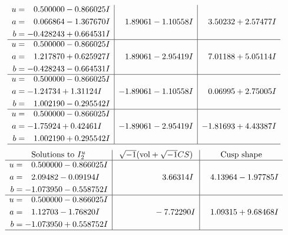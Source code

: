\documentclass[1p]{elsarticle_modified}
\theoremstyle{definition}
\newcommand{\I}{\sqrt{-1}}
\begin{document}
$$\begin{array}{c|c|c}
\begin{aligned}
u &= \phantom{-}0.500000 - 0.866025 I \\
a &= \phantom{-}0.066864 - 1.367670 I \\
b &= -0.428243 + 0.664531 I\end{aligned}
 & \phantom{-}1.89061 - 1.10558 I & \phantom{-}3.50232 + 2.57477 I \\ \hline\begin{aligned}
u &= \phantom{-}0.500000 - 0.866025 I \\
a &= \phantom{-}1.217870 + 0.625927 I \\
b &= -0.428243 - 0.664531 I\end{aligned}
 & \phantom{-}1.89061 - 2.95419 I & \phantom{-}7.01188 + 5.05114 I \\ \hline\begin{aligned}
u &= \phantom{-}0.500000 - 0.866025 I \\
a &= -1.24734 + 1.31124 I \\
b &= \phantom{-}1.002190 - 0.295542 I\end{aligned}
 & -1.89061 - 1.10558 I & \phantom{-}0.06995 + 2.75005 I \\ \hline\begin{aligned}
u &= \phantom{-}0.500000 - 0.866025 I \\
a &= -1.75924 + 0.42461 I \\
b &= \phantom{-}1.002190 + 0.295542 I\end{aligned}
 & -1.89061 - 2.95419 I & -1.81693 + 4.43387 I\\
 \hline 
 \end{array}$$\newpage$$\begin{array}{c|c|c}  
\text{Solutions to }I^u_{2}& \I (\text{vol} + \sqrt{-1}CS) & \text{Cusp shape}\\
 \hline 
\begin{aligned}
u &= \phantom{-}0.500000 - 0.866025 I \\
a &= \phantom{-}2.09482 - 0.09194 I \\
b &= -1.073950 - 0.558752 I\end{aligned}
 & \phantom{-0.000000 -}3.66314 I & \phantom{-}4.13964 - 1.97785 I \\ \hline\begin{aligned}
u &= \phantom{-}0.500000 - 0.866025 I \\
a &= \phantom{-}1.12703 - 1.76820 I \\
b &= -1.073950 + 0.558752 I\end{aligned}
 & \phantom{-0.000000 } -7.72290 I & \phantom{-}1.09315 + 9.68468 I\\
 \hline 
 \end{array}$$\newpage
\end{document}
